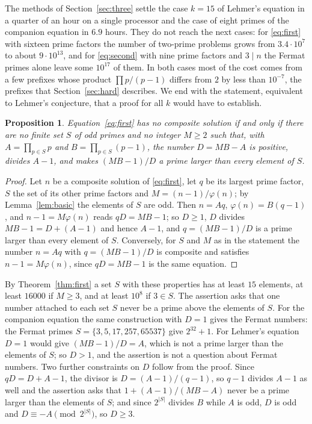 \documentclass[screen,reqno]{aomart}
\numberwithin{equation}{section}
\theoremstyle{plain}
\newtheorem{proposition}[theorem]{Proposition}
\theoremstyle{definition}
\theoremstyle{remark}
\begin{document}
The methods of Section~\ref{sec:three} settle the case $k=15$ of
Lehmer's equation in a quarter of an hour on a single processor and
the case of eight primes of the companion equation in $6.9$ hours.
They do not reach the next cases: for \eqref{eq:first} with sixteen
prime factors the number of two-prime problems grows from
$3.4\cdot10^7$ to about $9\cdot10^{13}$, and for \eqref{eq:second}
with nine prime factors and $3\mid n$ the Fermat primes alone leave
some $10^{17}$ of them. In both cases most of the cost comes from a
few prefixes whose product $\prod p/(p-1)$ differs from $2$ by less
than $10^{-7}$, the prefixes that Section~\ref{sec:hard} describes.
We end with the statement, equivalent to Lehmer's conjecture, that a
proof for all $k$ would have to establish.

\begin{proposition}\label{prop:equiv}
Equation~\eqref{eq:first} has no composite solution if and only if
there are no finite set $S$ of odd primes and no integer $M\ge2$ such
that, with $A=\prod_{p\in S}p$ and $B=\prod_{p\in S}(p-1)$, the number
$D=MB-A$ is positive, divides $A-1$, and makes $(MB-1)/D$ a prime
larger than every element of $S$.
\end{proposition}

\begin{proof}
Let $n$ be a composite solution of \eqref{eq:first}, let $q$ be its
largest prime factor, $S$ the set of its other prime factors and
$M=(n-1)/\varphi(n)$; by Lemma~\ref{lem:basic} the elements of $S$
are odd. Then $n=Aq$, $\varphi(n)=B(q-1)$, and $n-1=M\varphi(n)$ reads
$qD=MB-1$; so $D\ge1$, $D$ divides $MB-1=D+(A-1)$ and hence $A-1$,
and $q=(MB-1)/D$ is a prime larger than every element of $S$.
Conversely, for $S$ and $M$ as in the statement the number $n=Aq$ with
$q=(MB-1)/D$ is composite and satisfies $n-1=M\varphi(n)$, since
$qD=MB-1$ is the same equation.
\end{proof}

By Theorem~\ref{thm:first} a set $S$ with these properties has at
least $15$ elements, at least $16000$ if $M\ge3$, and at least $10^8$
if $3\in S$. The assertion asks that one number attached to each set
$S$ never be a prime above the elements of $S$. For the companion
equation the same construction with $D=1$ gives the Fermat numbers:
the Fermat primes $S=\{3,5,17,257,65537\}$ give $2^{32}+1$. For
Lehmer's equation $D=1$ would give $(MB-1)/D=A$, which is not a prime
larger than the elements of $S$; so $D>1$, and the assertion is not a
question about Fermat numbers. Two further constraints on $D$ follow
from the proof. Since $qD=D+A-1$, the divisor is
$D=(A-1)/(q-1)$, so $q-1$ divides $A-1$ as well and the assertion asks
that $1+(A-1)/(MB-A)$ never be a prime larger than the elements of
$S$; and since $2^{|S|}$ divides $B$ while $A$ is odd, $D$ is odd and
$D\equiv-A\pmod{2^{|S|}}$, so $D\ge3$.
\end{document}
